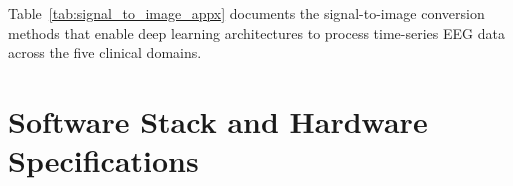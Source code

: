 Table~\ref{tab:signal_to_image_appx} documents the signal-to-image conversion methods that enable deep learning architectures to process time-series EEG data across the five clinical domains.

%


\section{Software Stack and Hardware Specifications}
\label{sec:appx_sw_hw}

